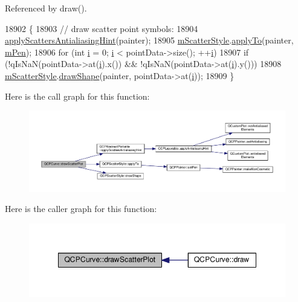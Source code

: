 Referenced by draw().


\begin{DoxyCode}
18902                                                                         \{
18903   \textcolor{comment}{// draw scatter point symbols:}
18904   \hyperlink{class_q_c_p_abstract_plottable_a753272ee225a62827e90c3e1e78de4b1}{applyScattersAntialiasingHint}(painter);
18905   \hyperlink{class_q_c_p_curve_a08f803b4a30b01bbd7a1eab15d0f864f}{mScatterStyle}.\hyperlink{class_q_c_p_scatter_style_a81817dfd404635f211e6ff2a04657d36}{applyTo}(painter, \hyperlink{class_q_c_p_abstract_plottable_a67bc0622fd1b9fa14e54c14922dcec66}{mPen});
18906   \textcolor{keywordflow}{for} (\textcolor{keywordtype}{int} \hyperlink{_comparision_pictures_2_createtest_image_8m_a6f6ccfcf58b31cb6412107d9d5281426}{i} = 0; \hyperlink{_comparision_pictures_2_createtest_image_8m_a6f6ccfcf58b31cb6412107d9d5281426}{i} < pointData->size(); ++\hyperlink{_comparision_pictures_2_createtest_image_8m_a6f6ccfcf58b31cb6412107d9d5281426}{i})
18907     \textcolor{keywordflow}{if} (!qIsNaN(pointData->at(\hyperlink{_comparision_pictures_2_createtest_image_8m_a6f6ccfcf58b31cb6412107d9d5281426}{i}).x()) && !qIsNaN(pointData->at(\hyperlink{_comparision_pictures_2_createtest_image_8m_a6f6ccfcf58b31cb6412107d9d5281426}{i}).y()))
18908       \hyperlink{class_q_c_p_curve_a08f803b4a30b01bbd7a1eab15d0f864f}{mScatterStyle}.\hyperlink{class_q_c_p_scatter_style_a992d531ac471ec2b29bdec6aeb400a06}{drawShape}(painter, pointData->at(\hyperlink{_comparision_pictures_2_createtest_image_8m_a6f6ccfcf58b31cb6412107d9d5281426}{i}));
18909 \}
\end{DoxyCode}


Here is the call graph for this function\+:\nopagebreak
\begin{figure}[H]
\begin{center}
\leavevmode
\includegraphics[width=350pt]{class_q_c_p_curve_a45593f30b81beec4b6130b6b53306087_cgraph}
\end{center}
\end{figure}




Here is the caller graph for this function\+:\nopagebreak
\begin{figure}[H]
\begin{center}
\leavevmode
\includegraphics[width=348pt]{class_q_c_p_curve_a45593f30b81beec4b6130b6b53306087_icgraph}
\end{center}
\end{figure}


